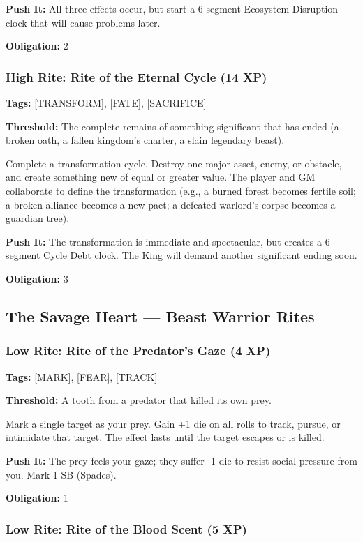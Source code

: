 \textbf{Push It:} All three effects occur, but start a 6-segment Ecosystem Disruption clock that will cause problems later.

\textbf{Obligation:} 2

\subsubsection{High Rite: Rite of the Eternal Cycle (14 XP)}

\textbf{Tags:} [TRANSFORM], [FATE], [SACRIFICE]

\textbf{Threshold:} The complete remains of something significant that has ended (a broken oath, a fallen kingdom's charter, a slain legendary beast).

Complete a transformation cycle. Destroy one major asset, enemy, or obstacle, and create something new of equal or greater value. The player and GM collaborate to define the transformation (e.g., a burned forest becomes fertile soil; a broken alliance becomes a new pact; a defeated warlord's corpse becomes a guardian tree).

\textbf{Push It:} The transformation is immediate and spectacular, but creates a 6-segment Cycle Debt clock. The King will demand another significant ending soon.

\textbf{Obligation:} 3

\subsection{The Savage Heart — Beast Warrior Rites}

\subsubsection{Low Rite: Rite of the Predator's Gaze (4 XP)}

\textbf{Tags:} [MARK], [FEAR], [TRACK]

\textbf{Threshold:} A tooth from a predator that killed its own prey.

Mark a single target as your prey. Gain +1 die on all rolls to track, pursue, or intimidate that target. The effect lasts until the target escapes or is killed.

\textbf{Push It:} The prey feels your gaze; they suffer -1 die to resist social pressure from you. Mark 1 SB (Spades).

\textbf{Obligation:} 1

\subsubsection{Low Rite: Rite of the Blood Scent (5 XP)}

